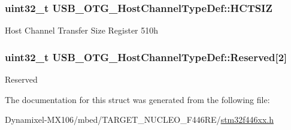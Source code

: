 \subsubsection[{\texorpdfstring{H\+C\+T\+S\+IZ}{HCTSIZ}}]{ uint32\+\_\+t U\+S\+B\+\_\+\+O\+T\+G\+\_\+\+Host\+Channel\+Type\+Def\+::\+H\+C\+T\+S\+IZ}\hypertarget{struct_u_s_b___o_t_g___host_channel_type_def_a14cb8c8dbbafdef182c82c0493ca48ab}{}\label{struct_u_s_b___o_t_g___host_channel_type_def_a14cb8c8dbbafdef182c82c0493ca48ab}
Host Channel Transfer Size Register 510h 
\subsubsection[{\texorpdfstring{Reserved}{Reserved}}]{\setlength{\rightskip}{0pt plus 5cm}uint32\+\_\+t U\+S\+B\+\_\+\+O\+T\+G\+\_\+\+Host\+Channel\+Type\+Def\+::\+Reserved\mbox{[}2\mbox{]}}\hypertarget{struct_u_s_b___o_t_g___host_channel_type_def_aa85d014d19b79d61bed7fdf134ed1037}{}\label{struct_u_s_b___o_t_g___host_channel_type_def_aa85d014d19b79d61bed7fdf134ed1037}
Reserved 

The documentation for this struct was generated from the following file\+:\begin{DoxyCompactItemize}
\item 
Dynamixel-\/\+M\+X106/mbed/\+T\+A\+R\+G\+E\+T\+\_\+\+N\+U\+C\+L\+E\+O\+\_\+\+F446\+R\+E/\hyperlink{stm32f446xx_8h}{stm32f446xx.\+h}\end{DoxyCompactItemize}
